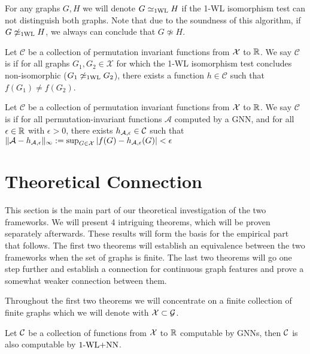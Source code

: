 \begin{definition}[1-WL Relation]
    For any graphs $G,H$ we will denote $G \simeq_{\text{1WL}} H$ if the 1-WL isomorphism test can not distinguish both graphs. Note that due to the soundness of this algorithm, if $G \not\simeq_{\text{1WL}} H$, we always can conclude that $G \not\simeq H$.
\end{definition}

\begin{definition}[$\wldisc$]
    Let $\mathcal{C}$ be a collection of permutation invariant functions from $\mathcal{X}$ to $\mathbb{R}$. We say $\mathcal{C}$ is \textbf{\wldisc} if for all graphs $G_1, G_2 \in \mathcal{X}$ for which the 1-WL isomorphism test concludes non-isomorphic ($G_1 \not\simeq_{\text{1WL}} G_2$), there exists a function $h \in \mathcal{C}$ such that $f(G_1) \neq f(G_2)$.
\end{definition}

\begin{definition}[$\gapp$]
    Let $\mathcal{C}$ be a collection of permutation invariant functions from $\mathcal{X}$ to $\mathbb{R}$. We say $\mathcal{C}$ is \textbf{\gapp} if for all permutation-invariant functions $\mathcal{A}$ computed by a GNN, and for all $\epsilon \in \mathbb{R}$ with $\epsilon > 0$, there exists $h_{\mathcal{A},\epsilon} \in \mathcal{C}$ such that $\| \mathcal{A} - h_{\mathcal{A},\epsilon} \|_\infty := \sup_{G \in \mathcal{X}} |f(G) - h_{\mathcal{A},\epsilon}(G)| < \epsilon$
\end{definition}

\section{Theoretical Connection}
This section is the main part of our theoretical investigation of the two frameworks. We will present 4 intriguing theorems, which will be proven separately afterwards. These results will form the basis for the empirical part that follows. The first two theorems will establish an equivalence between the two frameworks when the set of graphs is finite. The last two theorems will go one step further and establish a connection for continuous graph features and prove a somewhat weaker connection between them.

Throughout the first two theorems we will concentrate on a finite collection of finite graphs which we will denote with $\mathcal{X} \subset \mathcal{G}$.

\begin{theorem}\label{theorem:1wl_in_gnn}
    Let $\mathcal{C}$ be a collection of functions from $\mathcal{X}$ to $\mathbb{R}$ computable by GNNs, then $\mathcal{C}$ is also computable by $\text{1-WL+NN}$.
\end{theorem}

